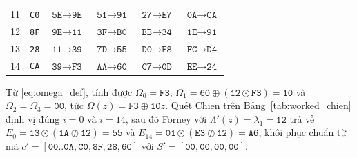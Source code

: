 \documentclass[11pt,a4paper]{report}
\begin{document}
\begin{table}[!htb]
\begin{tabular}{@{} c c c c c c @{}}
11 & \texttt{C0} & $\texttt{5E} \to \texttt{9E}$ & $\texttt{51} \to \texttt{91}$ & $\texttt{27} \to \texttt{E7}$ & $\texttt{0A} \to \texttt{CA}$ \\
12 & \texttt{8F} & $\texttt{9E} \to \texttt{11}$ & $\texttt{3F} \to \texttt{B0}$ & $\texttt{BB} \to \texttt{34}$ & $\texttt{1E} \to \texttt{91}$ \\
13 & \texttt{28} & $\texttt{11} \to \texttt{39}$ & $\texttt{7D} \to \texttt{55}$ & $\texttt{D0} \to \texttt{F8}$ & $\texttt{FC} \to \texttt{D4}$ \\
14 & \texttt{CA} & $\texttt{39} \to \mathbf{\texttt{F3}}$ & $\texttt{AA} \to \mathbf{\texttt{60}}$ & $\texttt{C7} \to \mathbf{\texttt{0D}}$ & $\texttt{EE} \to \mathbf{\texttt{24}}$ \\
\bottomrule
\end{tabular}
\end{table}

\begin{table}[!htb]
\centering
\caption{Bảng vết 4 bước lặp Berlekamp--Massey trên $S = [\texttt{F3}, \texttt{60}, \texttt{0D}, \texttt{24}]$.}
\label{tab:worked_bm}
\scriptsize
\setlength{\tabcolsep}{3.5pt}
\end{table}

Từ \eqref{eq:omega_def}, tính được $\Omega_0 = \texttt{F3}$, $\Omega_1 = \texttt{60} \oplus (\texttt{12}\odot\texttt{F3}) = \texttt{10}$ và $\Omega_2 = \Omega_3 = \texttt{00}$, tức $\Omega(z) = \texttt{F3} \oplus \texttt{10}z$. Quét Chien trên Bảng~\ref{tab:worked_chien} định vị đúng $i=0$ và $i=14$, sau đó Forney với $\Lambda'(z) = \lambda_1 = \texttt{12}$ trả về $E_0 = \texttt{13} \odot (\texttt{1A}\oslash\texttt{12}) = \texttt{55}$ và $E_{14} = \texttt{01} \odot (\texttt{E3}\oslash\texttt{12}) = \texttt{A6}$, khôi phục chuẩn từ mã $c' = [\texttt{00}..\texttt{0A}, \texttt{C0}, \texttt{8F}, \texttt{28}, \texttt{6C}]$ với $S' = [\texttt{00},\texttt{00},\texttt{00},\texttt{00}]$.
\end{document}
